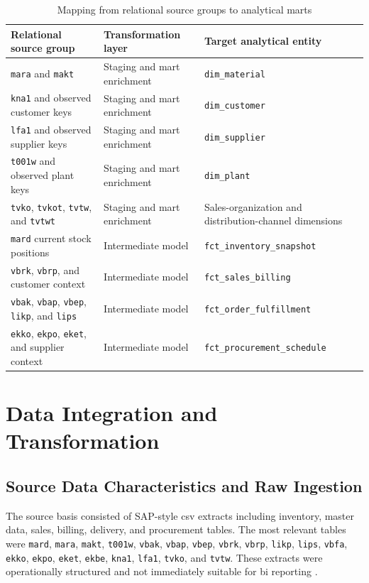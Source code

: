 \begin{table}[htbp]
\centering
\small
\caption{Mapping from relational source groups to analytical marts}
\label{tab:relational-to-dimensional-mapping}
\begin{tabular}{p{} p{} p{}}
\hline
\textbf{Relational source group} & \textbf{Transformation layer} & \textbf{Target analytical entity} \\
\hline
\texttt{mara} and \texttt{makt} & Staging and mart enrichment & \texttt{dim\_material} \\
\texttt{kna1} and observed customer keys & Staging and mart enrichment & \texttt{dim\_customer} \\
\texttt{lfa1} and observed supplier keys & Staging and mart enrichment & \texttt{dim\_supplier} \\
\texttt{t001w} and observed plant keys & Staging and mart enrichment & \texttt{dim\_plant} \\
\texttt{tvko}, \texttt{tvkot}, \texttt{tvtw}, and \texttt{tvtwt} & Staging and mart enrichment & Sales-organization and distribution-channel dimensions \\
\texttt{mard} current stock positions & Intermediate model & \texttt{fct\_inventory\_snapshot} \\
\texttt{vbrk}, \texttt{vbrp}, and customer context & Intermediate model & \texttt{fct\_sales\_billing} \\
\texttt{vbak}, \texttt{vbap}, \texttt{vbep}, \texttt{likp}, and \texttt{lips} & Intermediate model & \texttt{fct\_order\_fulfillment} \\
\texttt{ekko}, \texttt{ekpo}, \texttt{eket}, and supplier context & Intermediate model & \texttt{fct\_procurement\_schedule} \\
\hline
\end{tabular}
\normalsize
\end{table}

\section{Data Integration and Transformation}

\subsection{Source Data Characteristics and Raw Ingestion}

The source basis consisted of SAP-style \ac{csv} extracts including inventory, master data, sales, billing, delivery, and procurement tables. The most relevant tables were \texttt{mard}, \texttt{mara}, \texttt{makt}, \texttt{t001w}, \texttt{vbak}, \texttt{vbap}, \texttt{vbep}, \texttt{vbrk}, \texttt{vbrp}, \texttt{likp}, \texttt{lips}, \texttt{vbfa}, \texttt{ekko}, \texttt{ekpo}, \texttt{eket}, \texttt{ekbe}, \texttt{kna1}, \texttt{lfa1}, \texttt{tvko}, and \texttt{tvtw}. These extracts were operationally structured and not immediately suitable for \ac{bi} reporting \parencite{nambiar_overview_2022}.


